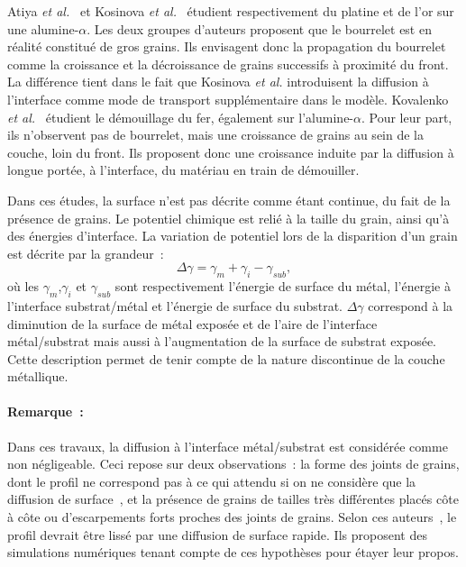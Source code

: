 Atiya \textit{et al.}~\cite{atiya2014role} et Kosinova \textit{et al.}~\cite{kosinova2014role} étudient respectivement du platine et de l'or sur une alumine-$\alpha$. Les deux groupes d'auteurs proposent que le bourrelet est en réalité constitué de gros grains. Ils envisagent donc la propagation du bourrelet comme la croissance et la décroissance de grains successifs à proximité du front. La différence tient dans le fait que Kosinova \textit{et al.} introduisent la diffusion à l'interface comme mode de transport supplémentaire dans le modèle. Kovalenko \textit{et al.}~\cite{kovalenko2013solid} étudient le démouillage du fer, également sur l'alumine-$\alpha$. Pour leur part, ils n'observent pas de bourrelet, mais une croissance de grains au sein de la couche, loin du front. Ils proposent donc une croissance induite par la diffusion à longue portée, à l'interface, du matériau en train de démouiller. \par 
Dans ces études, la surface n'est pas décrite comme étant continue, du fait de la présence de grains. Le potentiel chimique est relié à la taille du grain, ainsi qu'à des énergies d'interface. La variation de potentiel lors de la disparition d'un grain est décrite par la grandeur~:
\begin{equation}
\Delta\gamma = \gamma_m+\gamma_i-\gamma_{sub},
\end{equation}
où les $\gamma_m$,$\gamma_i$ et $\gamma_{sub}$ sont respectivement l'énergie de surface du métal, l'énergie à l'interface substrat/métal et l'énergie de surface du substrat. $\Delta\gamma$ correspond à la diminution de la surface de métal exposée et de l'aire de l'interface métal/substrat mais aussi à l'augmentation de la surface de substrat exposée. Cette description permet de tenir compte de la nature discontinue de la couche métallique.\par 

\paragraph*{Remarque~:} Dans ces travaux, la diffusion à l'interface métal/substrat est considérée comme non négligeable. Ceci repose sur deux observations~: la forme des joints de grains, dont le profil ne correspond pas à ce qui attendu si on ne considère que la diffusion de surface~\cite{amram2014grain}, et la présence de grains de tailles très différentes placés côte à côte ou d'escarpements forts proches des joints de grains. Selon ces auteurs~\cite{kosinova2014role,kosinova2015mechanisms}, le profil devrait être lissé par une diffusion de surface rapide. Ils proposent des simulations numériques tenant compte de ces hypothèses pour étayer leur propos.\par 

